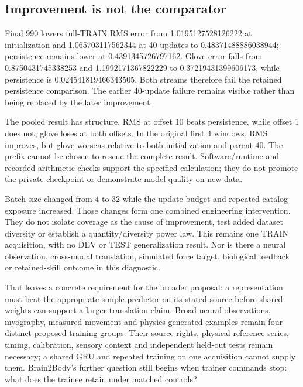 \subsection{Improvement is not the comparator}
Final 990 lowers full-TRAIN RMS error from 1.0195127528126222 at initialization and 1.065703117562344 at 40 updates to 0.48371488886038944; persistence remains lower at 0.4391345726797162. Glove error falls from 0.8750431745338253 and 1.1992171367822229 to 0.37219431399606173, while persistence is 0.024541819466343505. Both streams therefore fail the retained persistence comparison. The earlier 40-update failure remains visible rather than being replaced by the later improvement.

The pooled result has structure. RMS at offset 10 beats persistence, while offset 1 does not; glove loses at both offsets. In the original first 4 windows, RMS improves, but glove worsens relative to both initialization and parent 40. The prefix cannot be chosen to rescue the complete result. Software/runtime and recorded arithmetic checks support the specified calculation; they do not promote the private checkpoint or demonstrate model quality on new data.

Batch size changed from 4 to 32 while the update budget and repeated catalog exposure increased. Those changes form one combined engineering intervention. They do not isolate coverage as the cause of improvement, test added dataset diversity or establish a quantity/diversity power law. This remains one TRAIN acquisition, with no DEV or TEST generalization result. Nor is there a neural observation, cross-modal translation, simulated force target, biological feedback or retained-skill outcome in this diagnostic.

That leaves a concrete requirement for the broader proposal: a representation must beat the appropriate simple predictor on its stated source before shared weights can support a larger translation claim. Broad neural observations, myography, measured movement and physics-generated examples remain four distinct proposed training groups. Their source rights, physical reference series, timing, calibration, sensory context and independent held-out tests remain necessary; a shared GRU and repeated training on one acquisition cannot supply them. Brain2Body's further question still begins when trainer commands stop: what does the trainee retain under matched controls?
